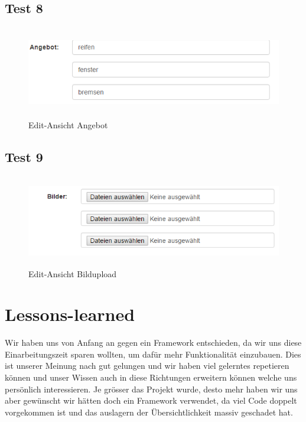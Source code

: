 \documentclass[11pt,a4paper]{scrreprt}
\begin{document}
{\section{Test 8}
\begin{figure}[H]
\includegraphics[height=4cm]{./Bilder/dienstleistung.png}
\centering
\caption{Edit-Ansicht Angebot}
\end{figure}
\section{Test 9}
\begin{figure}[H]
\includegraphics[height=4cm]{./Bilder/bilder.png}
\centering
\caption{Edit-Ansicht Bildupload}
\end{figure}

\newpage


\chapter{Lessons-learned}
Wir haben uns von Anfang an gegen ein Framework entschieden, 
da wir uns diese Einarbeitungszeit sparen wollten, um dafür mehr Funktionalität einzubauen. Dies ist unserer Meinung nach gut gelungen und wir haben viel gelerntes repetieren können und unser Wissen auch in diese Richtungen erweitern können welche uns persönlich interessieren. Je grösser das Projekt wurde, desto mehr haben wir uns aber gewünscht wir hätten doch ein Framework verwendet, da viel Code doppelt vorgekommen ist und das auslagern der Übersichtlichkeit massiv geschadet hat. 


}
\end{document}
